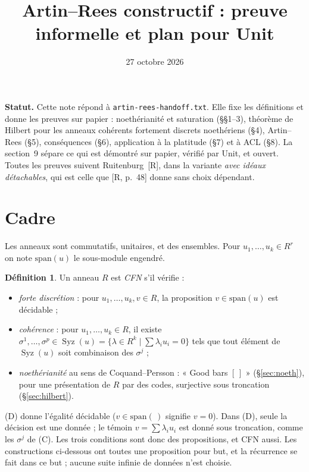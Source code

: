 \documentclass[11pt]{amsart}
\title{Artin--Rees constructif : preuve informelle et plan pour Unit}
\date{27 octobre 2026}
\theoremstyle{definition}
\newtheorem{definition}[theorem]{Définition}
\theoremstyle{remark}
\DeclareMathOperator{\Syz}{Syz}
\newcommand{\sm}{\mathrm{span}}
\begin{document}
\maketitle

\noindent\textbf{Statut.}
Cette note répond à \texttt{artin-rees-handoff.txt}. Elle fixe les
définitions et donne les preuves sur papier : noethérianité et
saturation (\S\S1--3), théorème de Hilbert pour les anneaux cohérents
fortement discrets noethériens (\S4), Artin--Rees (\S5), conséquences
(\S6), application à la platitude (\S7) et à ACL (\S8). La section~9
sépare ce qui est démontré sur papier, vérifié par Unit, et ouvert.
Toutes les preuves suivent Ruitenburg~[R], dans la variante \emph{avec
idéaux détachables}, qui est celle que [R, p.~48] donne sans choix
dépendant.

\section{Cadre}

Les anneaux sont commutatifs, unitaires, et des ensembles.
Pour $u_1,\dots,u_k\in R^r$ on note $\sm(u)$ le sous-module engendré.

\begin{definition}\label{def:cfn}
Un anneau $R$ est \emph{CFN} s'il vérifie :
\begin{itemize}
\item[(D)] \emph{forte discrétion} : pour $u_1,\dots,u_k,v\in R$, la
  proposition $v\in\sm(u)$ est décidable ;
\item[(C)] \emph{cohérence} : pour $u_1,\dots,u_k\in R$, il existe
  $\sigma^1,\dots,\sigma^p\in\Syz(u)=\{\lambda\in R^k\mid\sum\lambda_iu_i=0\}$
  tels que tout élément de $\Syz(u)$ soit combinaison des $\sigma^j$ ;
\item[(N)] \emph{noethérianité} au sens de Coquand--Persson : « Good bars
  $[\,]$ » (§\ref{sec:noeth}), pour une présentation de $R$ par des
  codes, surjective sous troncation (§\ref{sec:hilbert}).
\end{itemize}
\end{definition}

(D) donne l'égalité décidable ($v\in\sm(\,)$ signifie $v=0$).
Dans (D), seule la décision est une donnée ; le témoin $v=\sum\lambda_iu_i$
est donné sous troncation, comme les $\sigma^j$ de (C). Les trois
conditions sont donc des propositions, et CFN aussi. Les constructions
ci-dessous ont toutes une proposition pour but, et la récurrence se fait
dans ce but ; aucune suite infinie de données n'est choisie.
\end{document}
